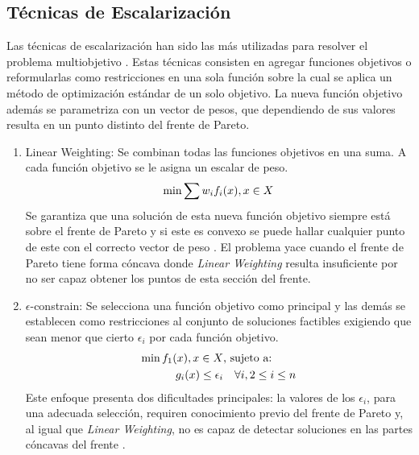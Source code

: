 \subsection{T\'ecnicas de Escalarizaci\'on }

Las t\'ecnicas de escalarizaci\'on han sido las m\'as utilizadas para resolver el problema multiobjetivo . Estas t\'ecnicas consisten en agregar funciones objetivos o  reformularlas como restricciones en una sola funci\'on sobre la cual se aplica un m\'etodo de optimizaci\'on est\'andar de un solo objetivo. La nueva funci\'on objetivo adem\'as se parametriza con un vector de pesos, que dependiendo de sus valores resulta en un punto distinto del frente de Pareto.
\begin{enumerate}
    \item Linear Weighting: Se combinan todas las funciones objetivos en una suma. A cada funci\'on objetivo se le asigna un escalar de peso.
    \begin{equation*}
        \min \sum w_i f_i(x), \space x \in X
    \end{equation*}
    Se garantiza que una soluci\'on de esta nueva funci\'on objetivo siempre est\'a sobre el frente de Pareto  y si este es convexo se puede hallar cualquier punto de este con el correcto vector de peso . El problema yace cuando el frente de Pareto tiene forma c\'oncava donde \textit{Linear Weighting} resulta insuficiente por no ser capaz obtener los puntos de esta secci\'on del frente.

    \item $\epsilon$-constrain: Se selecciona una funci\'on objetivo como principal y las dem\'as se establecen como restricciones al conjunto de soluciones factibles exigiendo que sean menor que cierto $\epsilon_i$  por cada funci\'on objetivo.
    \begin{align*}
            \min  f_1(x), \space x \in X  & \text{, sujeto a:}   \\
            g_i(x) \leq \epsilon_i & \quad  \forall i, 2 \leq i \leq n
    \end{align*}
    Este enfoque presenta dos dificultades principales: la valores de los $\epsilon_i$, para una adecuada selecci\'on, requiren conocimiento previo del frente de Pareto y, al igual que \textit{Linear Weighting}, no es capaz de detectar soluciones en las partes c\'oncavas del frente .


\end{enumerate}
